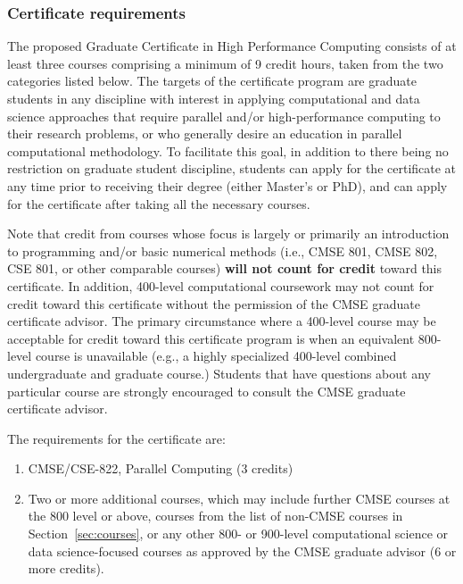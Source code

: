 \subsubsection{Certificate requirements}

The proposed Graduate Certificate in High Performance Computing
consists of at least three courses comprising a minimum of 9 credit
hours, taken from the two categories listed below. The targets of the
certificate program are graduate students in any discipline with
interest in applying computational and data science approaches that
require parallel and/or high-performance computing to their research
problems, or who generally desire an education in parallel
computational methodology. To facilitate this goal, in addition to
there being no restriction on graduate student discipline, students
can apply for the certificate at any time prior to receiving their
degree (either Master’s or PhD), and can apply for the certificate
after taking all the necessary courses.

Note that credit from courses whose focus is largely or primarily an
introduction to programming and/or basic numerical methods (i.e., CMSE
801, CMSE 802, CSE 801, or other comparable courses) \textbf{will not count
for credit} toward this certificate. In addition, 400-level
computational coursework may not count for credit toward this
certificate without the permission of the CMSE graduate certificate
advisor. The primary circumstance where a 400-level course may be
acceptable for credit toward this certificate program is when an
equivalent 800-level course is unavailable (e.g., a highly specialized
400-level combined undergraduate and graduate course.) Students that
have questions about any particular course are strongly encouraged to
consult the CMSE graduate certificate advisor.

\vspace{2mm}
\noindent
The requirements for the certificate are:

\begin{enumerate}

\item CMSE/CSE-822, Parallel Computing (3 credits)  

\item Two or more additional courses, which may include further CMSE
  courses at the 800 level or above, courses from the list of non-CMSE
  courses in Section~\ref{sec:courses}, or any other 800-
  or 900-level computational science or data science-focused courses
  as approved by the CMSE graduate advisor (6 or more credits).

\end{enumerate}

